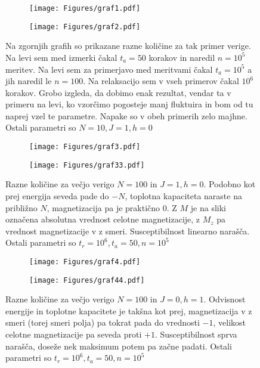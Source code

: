 \documentclass{article}
\begin{document}
\begin{figure}[H]
\centering
\begin{subfigure}{.49\textwidth}
\texttt{[image: Figures/graf1.pdf]}
\end{subfigure}
\begin{subfigure}{.49\textwidth}
\texttt{[image: Figures/graf2.pdf]}
\end{subfigure}
\caption*{Na zgornjih grafih so prikazane razne količine za tak primer verige. Na levi sem med izmerki čakal $t_a=50$ korakov  in naredil $n =10^5$ meritev. Na levi sem za primerjavo med meritvami čakal $t_a = 10^5$ a jih naredil le $n=100$. Na relaksacijo sem v vseh primerov čakal $10^6$ korakov. Grobo izgleda, da dobimo enak rezultat, vendar ta v primeru na levi, ko vzorčimo pogosteje manj fluktuira in bom od tu naprej vzel te parametre. Napake so v obeh primerih zelo majhne. Ostali parametri so $N=10, J=1, h=0$}
\end{figure}

\begin{figure}[H]
\centering
\begin{subfigure}{.49\textwidth}
\texttt{[image: Figures/graf3.pdf]}
\end{subfigure}
\begin{subfigure}{.49\textwidth}
\texttt{[image: Figures/graf33.pdf]}
\end{subfigure}
\caption*{Razne količine za večjo verigo $N=100$ in $J=1, h=0$.  Podobno kot prej energija seveda pade do $-N$, toplotna kapaciteta naraste na približno $N$, magnetizacija pa je praktično $0$. Z $M$ je na sliki označena absolutna vrednost celotne magnetizacije, z $M_z$ pa vrednost magnetizacije v z smeri. Susceptibilnost linearno narašča. Ostali parametri so $t_r = 10^6, t_a = 50, n=10^5$}
\end{figure}

\begin{figure}[H]
\centering
\begin{subfigure}{.49\textwidth}
\texttt{[image: Figures/graf4.pdf]}
\end{subfigure}
\begin{subfigure}{.49\textwidth}
\texttt{[image: Figures/graf44.pdf]}
\end{subfigure}
\caption*{Razne količine za večjo verigo $N=100$ in $J=0, h=1$.  Odvisnost energije in toplotne kapacitete je takšna kot prej, magnetizacija v z smeri (torej smeri polja) pa tokrat pada do vrednosti $-1$, velikost celotne magnetizacije pa seveda proti $+1$. Susceptibilnost sprva narašča, doseže nek maksimum potem pa začne padati. Ostali parametri so $t_r = 10^6, t_a = 50, n=10^5$}
\end{figure}
\end{document}
